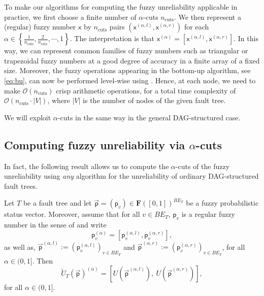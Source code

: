 \documentclass[runningheads]{llncs}
\newcommand{\basicevents}{\mathit{BE}}
\renewcommand{\emph}[1]{{\it #1}}
\begin{document}
To make our algorithms for computing the fuzzy unreliability applicable in practice, we first choose a finite number of $\alpha$-cuts $n_{\text{cuts}}$. We then represent a (regular) fuzzy number $\mathsf{x}$ by $n_{\text{cuts}}$ pairs $(\mathsf{x}^{(\alpha, l)}, \mathsf{x}^{(\alpha, r)})$ for each $\alpha \in \left\{\tfrac{1}{n_{\text{cuts}}},\tfrac{2}{n_{\text{cuts}}},\cdots,1\right\}$. The interpretation is that $\mathsf{x}^{(\alpha)} = [\mathsf{x}^{(\alpha, l)}, \mathsf{x}^{(\alpha, r)}]$. 
In this way, we can represent common families of fuzzy numbers such as triangular or trapezoidal fuzzy numbers at a good degree of accuracy in a finite array of a fixed size. Moreover, the fuzzy operations appearing in the bottom-up algorithm, see \eqref{eq:bu}, can now be performed level-wise using . Hence, at each node, we need to make $\mathcal{O}(n_{\text{cuts}})$ crisp arithmetic operations, for a total time complexity of $\mathcal{O}(n_{\text{cuts}}\cdot |V|)$, where $|V|$ is the number of nodes of the given fault tree.

We will exploit $\alpha$-cuts in the same way in the general DAG-structured case.









\subsection{Computing fuzzy unreliability  via $\alpha$-cuts}


 In fact, the following result allows us to compute the $\alpha$-cuts of the fuzzy unreliability using \emph{any} algorithm for the unreliability of ordinary DAG-structured fault trees.

\begin{theorem}\label{theo:DAG-algo}
    Let $T$ be a fault tree and let $\vec{\mathsf{p}}=(\mathsf{p}_v) \in \mathbf{F}([0,1])^{\basicevents_T}$
    be a fuzzy probabilistic status vector. Moreover, assume that for all $v\in \basicevents_T$, $\mathsf{p}_v$ is a regular fuzzy number in the sense of  and write 
    $$
    \mathsf{p}_v^{(\alpha)} = [\mathsf{p}_v^{(\alpha, l)}, \mathsf{p}_v^{(\alpha, r)}], 
    $$
    as well as, $\vec{\mathsf{p}}^{(\alpha, l)}:= (\mathsf{p}_v^{(\alpha, l)})_{v\in \basicevents_T}$ and $\vec{\mathsf{p}}^{(\alpha, r)}:= (\mathsf{p}_v^{(\alpha, r)})_{v\in \basicevents_T}$, for all $\alpha\in (0,1]$.  
    Then 
    $$
    \widetilde{U}_T(\vec{\mathsf{p}})^{(\alpha)} = \left[U\left(\vec{\mathsf{p}}^{(\alpha, l)}\right),\: U\left(\vec{\mathsf{p}}^{(\alpha, r)}\right)\right],
    $$
    for all $\alpha\in (0,1]$.
\end{theorem}
\end{document}
